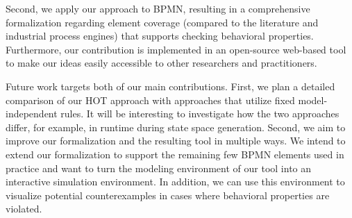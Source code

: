 \documentclass{lmcs} %
\begin{document}
Second, we apply our approach to BPMN, resulting in a comprehensive formalization regarding element coverage (compared to the literature and industrial process engines) that supports checking behavioral properties.
Furthermore, our contribution is implemented in an open-source web-based tool to make our ideas easily accessible to other researchers and practitioners.

Future work targets both of our main contributions.
First, we plan a detailed comparison of our HOT approach with approaches that utilize fixed model-independent rules.
It will be interesting to investigate how the two approaches differ, for example, in runtime during state space generation.
Second, we aim to improve our formalization and the resulting tool in multiple ways.
We intend to extend our formalization to support the remaining few BPMN elements used in practice and want to turn the modeling environment of our tool into an interactive simulation environment.
In addition, we can use this environment to visualize potential counterexamples in cases where behavioral properties are violated.

  
 

\end{document}
